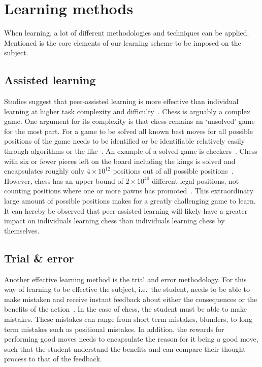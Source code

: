 \section{Learning methods}\label{sec:learning-methods}

When learning, a lot of different methodologies and techniques can be applied.
Mentioned is the core elements of our learning scheme to be imposed on the subject.


\subsection{Assisted learning}\label{subsec:assisted-learning}

Studies suggest that peer-assisted learning is more effective than individual learning at higher task complexity and
difficulty~\cite{carson2023}.
Chess is arguably a complex game.
One argument for its complexity is that chess remains an `unsolved' game for the most part.
For a game to be solved all known best moves for all possible positions of the game needs to be identified or be
identifiable relatively easily through algorithms or the like~\cite{herik2002}.
An example of a solved game is checkers~\cite{schaeffer2007}.
Chess with six or fewer pieces left on the board including the kings is solved and encapsulates roughly only
\( 4 \times 10^{12} \) positions out of all possible positions~\cite{syzygy2024}.
However, chess has an upper bound of \( 2 \times 10^{40} \) different legal positions, not counting positions where one
or more pawns has promoted~\cite{steinerberger2014}.
This extraordinary large amount of possible positions makes for a greatly challenging game to learn.
It can hereby be observed that peer-assisted learning will likely have a greater impact on individuals learning chess
than individuals learning chess by themselves.


\subsection{Trial \& error}\label{subsec:trial-and-error}

Another effective learning method is the trial and error methodology.
For this way of learning to be effective the subject, i.e.\ the student, needs to be able to make mistaken and receive
instant feedback about either the consequences or the benefits of the action~\cite{li2023}.
In the case of chess, the student must be able to make mistakes.
These mistakes can range from short term mistakes, blunders, to long term mistakes such as positional mistakes.
In addition, the rewards for performing good moves needs to encapsulate the reason for it being a good move, such that
the student understand the benefits and can compare their thought process to that of the feedback.

